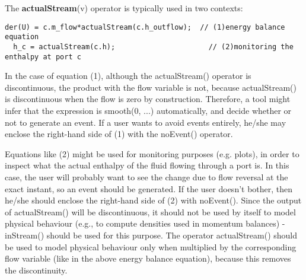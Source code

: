 \begin{nonnormative}
The \textbf{actualStream}(v) operator is typically used in two
contexts:
\begin{lstlisting}[language=modelica]
  der(U) = c.m_flow*actualStream(c.h_outflow);  // (1)energy balance equation
  h_c = actualStream(c.h);                      // (2)monitoring the enthalpy at port c
\end{lstlisting}
In the case of equation (1), although the actualStream() operator
is discontinuous, the product with the flow variable is not, because
actualStream() is discontinuous when the flow is zero by construction.
Therefore, a tool might infer that the expression is smooth(0, ...)
automatically, and decide whether or not to generate an event. If a user
wants to avoid events entirely, he/she may enclose the right-hand side
of (1) with the noEvent() operator.

Equations like (2) might be used for monitoring purposes (e.g.
plots), in order to inspect what the actual enthalpy of the fluid
flowing through a port is. In this case, the user will probably want to
see the change due to flow reversal at the exact instant, so an event
should be generated. If the user doesn't bother, then he/she should
enclose the right-hand side of (2) with noEvent(). Since the output of
actualStream() will be discontinuous, it should not be used by itself to
model physical behaviour (e.g., to compute densities used in momentum
balances) - inStream() should be used for this purpose. The operator
actualStream() should be used to model physical behaviour only when
multiplied by the corresponding flow variable (like in the above energy
balance equation), because this removes the discontinuity.
\end{nonnormative}
